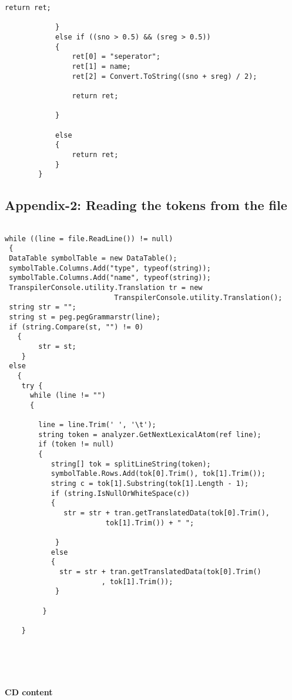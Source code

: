 \documentclass[23pt]{article}
\begin{document}
\begin{lstlisting}[label=some-code,caption= Code for training the system]
                return ret;

            }
            else if ((sno > 0.5) && (sreg > 0.5))
            {
                ret[0] = "seperator";
                ret[1] = name;
                ret[2] = Convert.ToString((sno + sreg) / 2);

                return ret;

            }

            else
            {
                return ret;
            }
        }

\end{lstlisting}

\subsection{ Appendix-2: Reading the tokens from the file}

\begin{lstlisting}[label=some-code,caption= Reading the tokens from the file]

while ((line = file.ReadLine()) != null)
 {
 DataTable symbolTable = new DataTable();
 symbolTable.Columns.Add("type", typeof(string));
 symbolTable.Columns.Add("name", typeof(string));
 TranspilerConsole.utility.Translation tr = new 
                          TranspilerConsole.utility.Translation();
 string str = "";
 string st = peg.pegGrammarstr(line);
 if (string.Compare(st, "") != 0)
   {
        str = st;
    }
 else
   {
    try {
      while (line != "")
      {

        line = line.Trim(' ', '\t');
        string token = analyzer.GetNextLexicalAtom(ref line);
        if (token != null)
        {
           string[] tok = splitLineString(token);             
           symbolTable.Rows.Add(tok[0].Trim(), tok[1].Trim());
           string c = tok[1].Substring(tok[1].Length - 1);      
           if (string.IsNullOrWhiteSpace(c))
           {
              str = str + tran.getTranslatedData(tok[0].Trim(),
                        tok[1].Trim()) + " ";

            }
           else
           {
             str = str + tran.getTranslatedData(tok[0].Trim()
                       , tok[1].Trim());
            }

         }

    }                  



\end{lstlisting}

{\Large  \textbf{\\ \\ CD content} \par}
\end{document}
